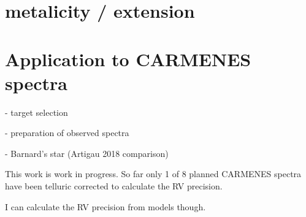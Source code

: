 \section{ metalicity / \Logg{} extension}



\section{Application to {CARMENES} spectra}

- target selection

- preparation of observed spectra

- Barnard's star (Artigau 2018 comparison)


This work is work in progress.
So far only 1 of 8 planned {CARMENES} spectra have been telluric corrected to calculate the {RV} precision.

{I can calculate the {RV} precision from models though.}
